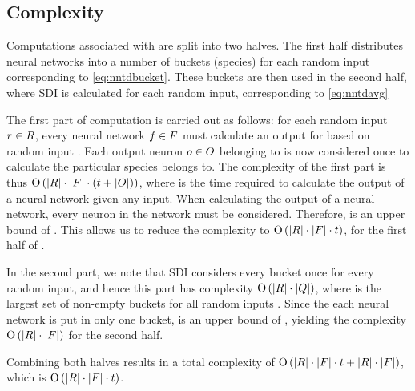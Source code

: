 \subsection{Complexity}
Computations associated with \dia{} are split into two halves. The first half distributes neural networks into a number of buckets (species) for each random input corresponding to \cref{eq:nntdbucket}. These buckets are then used in the second half, where SDI is calculated for each random input, corresponding to \cref{eq:nntdavg}

The first part of computation is carried out as follows: for each random input $r \in R$, every neural network $f \in F$ must calculate an output for based on random input \ran. Each output neuron $o \in O$ belonging to \ind{} is now considered once to calculate the particular species \ind{} belongs to. The complexity of the first part is thus $\operatorname{O}\left(\lvert R\rvert \cdot \lvert F\rvert \cdot \left(t + \lvert O\rvert\right)\right)$, where \timet{} is the time required to calculate the output of a neural network given any input. When calculating the output of a neural network, every neuron in the network must be considered. Therefore, \timet{} is an upper bound of \nnoutsetl. This allows us to reduce the complexity to $\operatorname{O}\left(\lvert R\rvert \cdot \lvert F\rvert \cdot t\right)$, for the first half of \dia.

In the second part, we note that SDI considers every bucket once for every random input, and hence this part has complexity $\operatorname{O}\left(\lvert R\rvert\cdot\lvert Q\rvert\right)$, where \nemptyspeciesset{} is the largest set of non-empty buckets for all random inputs \ranset. Since the each neural network is put in only one bucket, \indsetl{} is an upper bound of \nemptyspeciessetl, yielding the complexity $\operatorname{O}\left(\lvert R\rvert\cdot\lvert F\rvert\right)$ for the second half.

Combining both halves results in a total complexity of $\operatorname{O}\left(\lvert R\rvert \cdot \lvert F\rvert \cdot t + \lvert R\rvert \cdot \lvert F\rvert\right)$, which is $\operatorname{O}\left(\lvert R\rvert\cdot\lvert F\rvert\cdot t\right)$.

